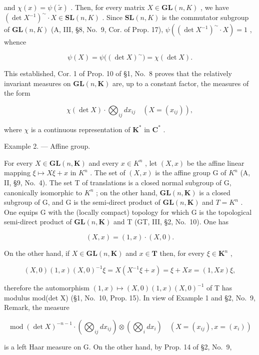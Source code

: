 and \(\chi(x) = \psi(\widetilde{x})\) . Then, for every matrix \(X \in \mathbf{GL}(n, K)\) , we have \((\det X^{-1})^{\sim} \cdot X \in \mathbf{SL}(n, K)\) . Since \(\mathbf{SL}(n, K)\) is the commutator subgroup of \(\mathbf{GL}(n, K)\) (A, III, §8, No.~9, Cor. of Prop. 17), \(\psi((\det X^{-1})^{\sim} \cdot X) = 1\) , whence

\[
\psi (X) = \psi \big ((\det X) ^ {\sim} \big) = \chi (\det X).
\]

This established, Cor. 1 of Prop. 10 of §1, No.~8 proves that the relatively invariant measures on \(\mathbf{GL}(n,\mathbf{K})\) are, up to a constant factor, the measures of the form

\[
\chi (\det X) \cdot \bigotimes_ {i j} d x _ {i j} \quad (X = (x _ {i j})),\tag{4}
\]

where \(\chi\) is a continuous representation of \(\mathbf{K}^*\) in \(\mathbf{C}^*\) .

Example 2. --- Affine group.

For every \(X \in \mathbf{GL}(n, \mathbf{K})\) and every \(x \in K^{n}\) , let \((X, x)\) be the affine linear mapping \(\xi \mapsto X\xi + x\) in \(K^{n}\) . The set of \((X, x)\) is the affine group G of \(K^{n}\) (A, II, §9, No.~4). The set T of translations is a closed normal subgroup of G, canonically isomorphic to \(K^{n}\) ; on the other hand, \(\mathbf{GL}(n, \mathbf{K})\) is a closed subgroup of G, and G is the semi-direct product of \(\mathbf{GL}(n, \mathbf{K})\) and \(T = K^{n}\) . One equips G with the (locally compact) topology for which G is the topological semi-direct product of \(\mathbf{GL}(n, \mathbf{K})\) and T (GT, III, §2, No.~10). One has

\[
(X, x) = (1, x) \cdot (X, 0).
\]

On the other hand, if \(X \in \mathbf{GL}(n, \mathbf{K})\) and \(x \in \mathbf{T}\) then, for every \(\xi \in \mathbf{K}^n\) ,

\[
(X, 0) (1, x) (X, 0) ^ {- 1} \xi = X (X ^ {- 1} \xi + x) = \xi + X x = (1, X x) \xi ,
\]

therefore the automorphism \((1,x)\mapsto(X,0)(1,x)(X,0)^{-1}\) of T has modulus mod(det X) (§1, No.~10, Prop. 15). In view of Example 1 and §2, No.~9, Remark, the measure

\[
\operatorname{mod} (\det X) ^ {- n - 1} \cdot \left(\bigotimes_ {i j} d x _ {i j}\right) \otimes \left(\bigotimes_ {i} d x _ {i}\right) \quad (X = (x _ {i j}), x = (x _ {i}))\tag{5}
\]

is a left Haar measure on G. On the other hand, by Prop. 14 of §2, No.~9,


